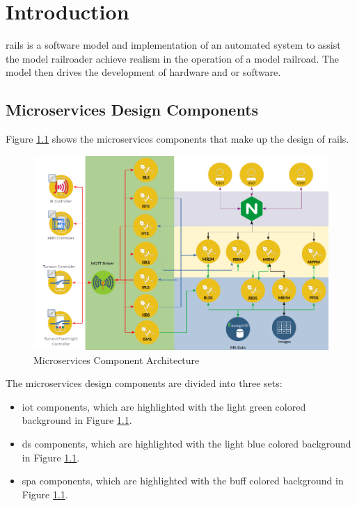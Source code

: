 \chapter{Introduction}
\gls{rails} is a software model and implementation of an automated system to assist the model railroader achieve realism in the operation of a model railroad. The model then drives the development of hardware and or software.
\section{Microservices Design Components}
Figure \ref{fig:microarchitecture} shows the microservices components that make up the design of \gls{rails}.

\begin{figure}[H]
	\centering
		\includegraphics[scale=0.7]{../System/design.png}
	\caption{Microservices Component Architecture}
	\label{fig:microarchitecture}
\end{figure}

The microservices design components are divided into three sets:
\begin{itemize}
  \item \gls{iot} components, which are highlighted with the light green colored background in Figure \ref{fig:microarchitecture}.
  \item \gls{ds} components, which are highlighted with the light blue colored background in Figure \ref{fig:microarchitecture}.
  \item \gls{spa} components, which are highlighted with the buff colored background in Figure \ref{fig:microarchitecture}.
\end{itemize}

